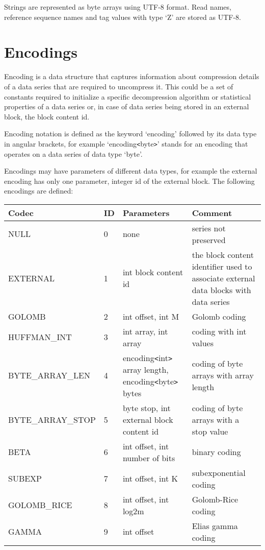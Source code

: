 \documentclass[a4paper]{article}
\begin{document}
Strings are represented as byte arrays using UTF-8 format. Read names, reference 
sequence names and tag values with type `Z' are stored as UTF-8.

\section{\textbf{Encodings }}

Encoding is a data structure that captures information about compression details 
of a data series that are required to uncompress it. This could be a set of constants 
required to initialize a specific decompression algorithm or statistical properties 
of a data series or, in case of data series being stored in an external block, 
the block content id. 

Encoding notation is defined as the keyword `encoding' followed by its data type 
in angular brackets, for example `encoding\texttt{<}byte\texttt{>}' stands for 
an encoding that operates on a data series of data type `byte'. 

Encodings may have parameters of different data types, for example the external 
encoding has only one parameter, integer id of the external block. The following 
encodings are defined: 

\begin{tabular}{|l|l|>{\raggedright}p{155pt}|>{\raggedright}p{160pt}|}
\hline
\textbf{Codec} & \textbf{ID} & \textbf{Parameters} & \textbf{Comment}\tabularnewline
\hline
NULL & 0 & none & series not preserved\tabularnewline
\hline
EXTERNAL & 1 & int block content id & the block content identifier used to associate 
external data blocks with data series\tabularnewline
\hline
GOLOMB & 2 & int offset, int M & Golomb coding\tabularnewline
\hline
HUFFMAN\_INT & 3 & int array, int array & coding with int values\tabularnewline
\hline
BYTE\_ARRAY\_LEN & 4 & encoding\texttt{<}int\texttt{>} array length, encoding\texttt{<}byte\texttt{>} 
bytes & coding of byte arrays with array length\tabularnewline
\hline
BYTE\_ARRAY\_STOP & 5 & byte stop, int external block\linebreak{}
content id & coding of byte arrays with a stop value \tabularnewline
\hline
BETA & 6 & int offset, int number of bits & binary coding\tabularnewline
\hline
SUBEXP & 7 & int offset, int K & subexponential coding\tabularnewline
\hline
GOLOMB\_RICE & 8 & int offset, int log2m & Golomb-Rice coding\tabularnewline
\hline
GAMMA & 9 & int offset & Elias gamma coding\tabularnewline
\hline
\end{tabular}
\end{document}
